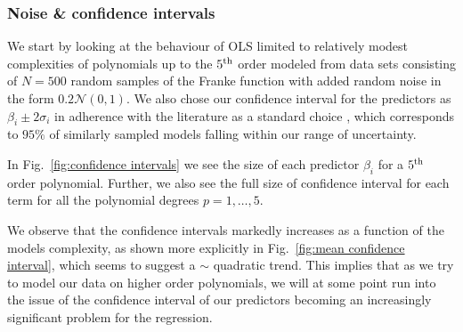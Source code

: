 \documentclass[reprint, english, nofootinbib]{revtex4-2}
\begin{document}
\subsubsection{Noise \& confidence intervals}

\noindent
We start by looking at the behaviour of OLS limited to relatively modest complexities of polynomials up to the $5^{\textup{th}}$ order modeled from data sets consisting of $N=500$ random samples of the Franke function with added random noise in the form $0.2\mathcal N(0, 1)$. We also chose our confidence interval for the predictors as $\beta_i\pm 2\sigma_i$ in adherence with the literature as a standard choice \cite{hastie}, which corresponds to $95\%$ of similarly sampled models falling within our range of uncertainty.

In Fig.~\ref{fig:confidence intervals} we see the size of each predictor $\beta_i$ for a $5^{\textup{th}}$ order polynomial. Further, we also see the full size of confidence interval for each term for all the polynomial degrees $p = 1,\dots, 5$.

We observe that the confidence intervals markedly increases as a function of the models complexity, as shown more explicitly in Fig.~\ref{fig:mean confidence interval}, which seems to suggest a $\sim$ quadratic trend. This implies that as we try to model our data on higher order polynomials, we will at some point run into the issue of the confidence interval of our predictors becoming an increasingly significant problem for the regression.
\end{document}
